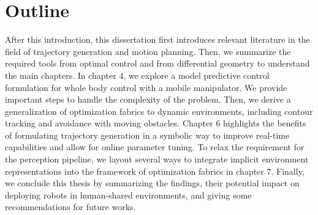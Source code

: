 \section{Outline}

After this introduction, this dissertation first introduces
relevant literature in the field of trajectory generation
and motion planning. Then, we summarize the required tools
from optimal control and from differential geometry to
understand the main chapters. In chapter 4, we explore a
model predictive control formulation for whole body control
with a mobile manipulator. We provide important steps to
handle the complexity of the problem. Then, we derive a
generalization of optimization fabrics to dynamic
environments, including contour tracking and avoidance with
moving obstacles. Chapter 6 highlights the benefits of
formulating trajectory generation in a symbolic way to
improve real-time capabilities and allow for online
parameter tuning. To relax the requirement for the
perception pipeline, we layout several ways to integrate
implicit environment representations into the framework of
optimization fabrics in chapter 7. Finally, we conclude this
thesis by summarizing the findings, their potential impact
on deploying robots in human-shared environments, and giving some
recommendations for future works.

